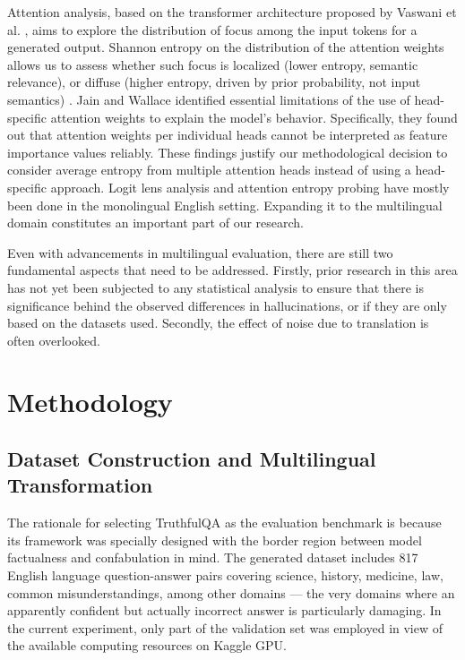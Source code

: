 \documentclass[conference]{IEEEtran}
\begin{document}
Attention analysis, based on the transformer architecture proposed by Vaswani et al. \cite{b3}, aims to explore the distribution of focus among the input tokens for a generated output. Shannon entropy on the distribution of the attention weights allows us to assess whether such focus is localized (lower entropy, semantic relevance), or diffuse (higher entropy, driven by prior probability, not input semantics) \cite{b21}. Jain and Wallace \cite{b29} identified essential limitations of the use of head-specific attention weights to explain the model’s behavior. Specifically, they found out that attention weights per individual heads cannot be interpreted as feature importance values reliably. These findings justify our methodological decision to consider average entropy from multiple attention heads instead of using a head-specific approach. Logit lens analysis and attention entropy probing have mostly been done in the monolingual English setting. Expanding it to the multilingual domain constitutes an important part of our research.



Even with advancements in multilingual evaluation, there are still two fundamental aspects that need to be addressed. Firstly, prior research in this area has not yet been subjected to any statistical analysis to ensure that there is significance behind the observed differences in hallucinations, or if they are only based on the datasets used. Secondly, the effect of noise due to translation is often overlooked.

\section{Methodology}

\subsection{Dataset Construction and Multilingual Transformation}

The rationale for selecting TruthfulQA \cite{b1} as the evaluation benchmark is because its framework was specially designed with the border region between model factualness and confabulation in mind. The generated dataset includes 817 English language question-answer pairs covering science, history, medicine, law, common misunderstandings, among other domains — the very domains where an apparently confident but actually incorrect answer is particularly damaging. In the current experiment, only part of the validation set was employed in view of the available computing resources on Kaggle GPU.
\end{document}

